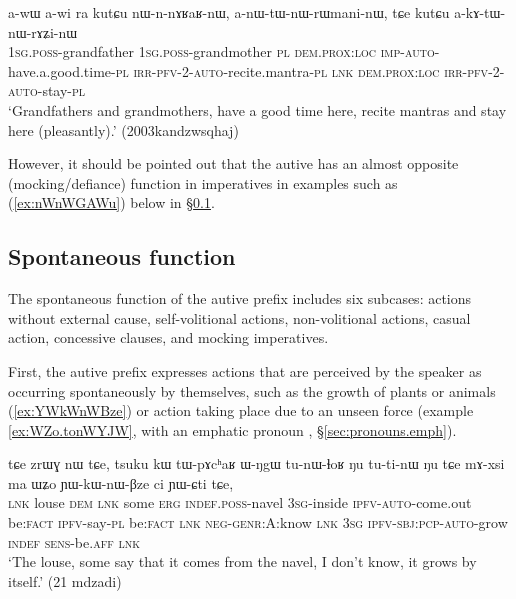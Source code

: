 \begin{exe}
\ex \label{ex:anWtWnWrWmaninW}
\gll a-wɯ a-wi ra kutɕu nɯ-n-nɤʁaʁ-nɯ, a-nɯ-tɯ-nɯ-rɯmani-nɯ, tɕe kutɕu a-kɤ-tɯ-nɯ-rɤʑi-nɯ \\
\textsc{1sg}.\textsc{poss}-grandfather \textsc{1sg}.\textsc{poss}-grandmother \textsc{pl} \textsc{dem}.\textsc{prox}:\textsc{loc} \textsc{imp}-\textsc{auto}-have.a.good.time-\textsc{pl} \textsc{irr}-\textsc{pfv}-2-\textsc{auto}-recite.mantra-\textsc{pl} \textsc{lnk} \textsc{dem}.\textsc{prox}:\textsc{loc} \textsc{irr}-\textsc{pfv}-2-\textsc{auto}-stay-\textsc{pl} \\
\glt `Grandfathers and grandmothers, have a good time here, recite mantras and stay here (pleasantly).' (2003kandzwsqhaj)
\end{exe}

However, it should be pointed out that the autive has an almost opposite (mocking/defiance) function in imperatives in examples such as (\ref{ex:nWnWGAWu}) below in §\ref{sec:autoben.spontaneous}.
 
\subsection{Spontaneous function}  \label{sec:autoben.spontaneous} 
The spontaneous function of the autive prefix includes six subcases: actions without external cause, self-volitional actions, non-volitional actions, casual action, concessive clauses,  and mocking imperatives.

First, the autive prefix expresses actions that are perceived by the speaker as occurring spontaneously by themselves, such as the growth of plants or animals (\ref{ex:YWkWnWBze}) or action taking place due to an unseen force (example \ref{ex:WZo.tonWYJW}, with an emphatic pronoun , §\ref{sec:pronouns.emph}).

\begin{exe}
\ex \label{ex:YWkWnWBze}
\gll tɕe zrɯɣ nɯ tɕe, tsuku kɯ tɯ-pɤcʰaʁ ɯ-ŋgɯ tu-nɯ-ɬoʁ ŋu tu-ti-nɯ ŋu tɕe mɤ-xsi ma ɯʑo ɲɯ-kɯ-nɯ-βze ci ɲɯ-ɕti tɕe, 	\\
\textsc{lnk} louse \textsc{dem} \textsc{lnk} some \textsc{erg} \textsc{indef}.\textsc{poss}-navel \textsc{3sg}-inside \textsc{ipfv}-\textsc{auto}-come.out be:\textsc{fact} \textsc{ipfv}-say-\textsc{pl}  be:\textsc{fact} \textsc{lnk} \textsc{neg}-\textsc{genr}:A:know \textsc{lnk} \textsc{3sg} \textsc{ipfv}-\textsc{sbj}:\textsc{pcp}-\textsc{auto}-grow \textsc{indef} \textsc{sens}-be.\textsc{aff} \textsc{lnk} \\
\glt `The louse, some say that it comes from the navel, I don't know, it grows by itself.' (21 mdzadi) 
\end{exe}

